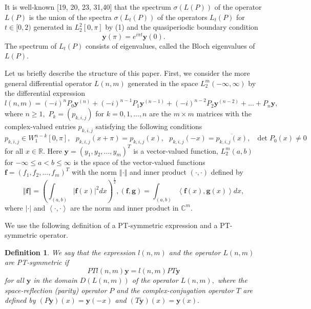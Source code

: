 \documentclass{article}%
\newtheorem{definition}{Definition}
\begin{document}
It is well-known [19, 20, 23, 31,40] that the spectrum $\sigma(L(P))$ of the
operator $L(P)$ is the union of the spectra $\sigma(L_{t}(P))$ of the
operators $L_{t}(P)$ for $t\in\lbrack0,2)$ generated in $L_{2}^{2}[0,\pi]$ by
(1) and the quasiperiodic boundary condition
\begin{equation}
\mathbf{y}(\pi)=e^{i\pi t}\mathbf{y}(0). \tag{2}%
\end{equation}
The spectrum of $L_{t}(P)$ consists of eigenvalues, called the Bloch
eigenvalues of $L(P).$

Let us briefly describe the structure of this paper. First, we consider the
more general differential operator $L(n,m)$ generated in the space $L_{2}%
^{m}(-\infty,\infty)$ by the differential expression
\begin{equation}
l(n,m)=(-i)^{n}P_{0}\mathbf{y}^{(n)}+(-i)^{n-1}P_{1}\mathbf{y}^{(n-1)}%
+(-i)^{n-2}P_{2}\mathbf{y}^{(n-2)}+...+P_{n}\mathbf{y}, \tag{3}%
\end{equation}
where $n\geq1,$ $P_{k}=(p_{k,i,j})$ for $k=0,1,...,n$ are the $m\times m$
matrices with the complex-valued entries $p_{k,i,j}$ satisfying the following
conditions
\begin{equation}
p_{k,i,j}\in W_{1}^{n-k}[0,\pi],\text{ }p_{k,i,j}\left(  x+\pi\right)
=p_{k,i,j}\left(  x\right)  ,\text{ }p_{k,i,j}\left(  -x\right)
=\overline{p_{k,i,j}\left(  x\right)  },\text{ }\det P_{0}(x)\neq0 \tag{4}%
\end{equation}
for all $x\in\mathbb{R}.$ Here $\mathbf{y}=(y_{1},y_{2},...,y_{m})^{T}$ is a
vector-valued function, $L_{2}^{m}(a,b)$ for $-\infty\leq a<b\leq\infty$ is
the space of the vector-valued functions $\mathbf{f}=\left(  f_{1}%
,f_{2},...,f_{m}\right)  ^{T}$ with the norm $\left\Vert \cdot\right\Vert $
and inner product $(\cdot,\cdot)$ defined by%
\[
\left\Vert \mathbf{f}\right\Vert =\left(  \int\nolimits_{(a,b)}\left\vert
\mathbf{f}\left(  x\right)  \right\vert ^{2}dx\right)  ^{\frac{1}{2}},\text{
}(\mathbf{f,g})=\int\nolimits_{(a,b)}\left\langle \mathbf{f}\left(  x\right)
,\mathbf{g}\left(  x\right)  \right\rangle dx,
\]
where $\left\vert \cdot\right\vert $ and $\left\langle \cdot,\cdot
\right\rangle $ are the norm and inner product in $\mathbb{C}^{m}.$

We use the following definition of a PT-symmetric expression and a
PT-symmetric operator.

\begin{definition}
We say that the expression $l(n,m)$ and the operator $L(n,m)$ are PT-symmetric
if
\[
PTl(n,m)\mathbf{y}=l(n,m)PT\mathbf{y}%
\]
for all $\mathbf{y}$ in the domain $D(L(n,m))$ of the operator $L(n,m),$ where
the space-reflection (parity) operator $P$ and the complex-conjugation
operator $T$ are defined by $(P\mathbf{y})(x)=\mathbf{y}(-x)$ and
$(T\mathbf{y})(x)=\overline{\mathbf{y}(x)}.$
\end{definition}
\end{document}
